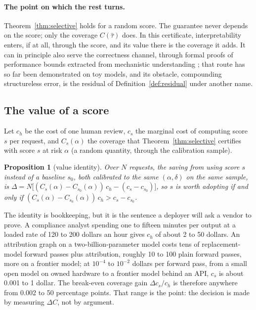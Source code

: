 \documentclass[11pt,letterpaper]{article}
\newcommand{\tauhat}{\hat{\tau}}
\theoremstyle{plain}
\newtheorem{proposition}{Proposition}
\theoremstyle{definition}
\theoremstyle{remark}
\begin{document}
\paragraph{The point on which the rest turns.} Theorem~\ref{thm:selective} holds for a random score. The guarantee never depends on the score; only the coverage $C(\tauhat)$ does. In this certificate, interpretability enters, if at all, through the score, and its value there is the coverage it adds. It can in principle also serve the correctness channel, through formal proofs of performance bounds extracted from mechanistic understanding \citep{gross2024}; that route has so far been demonstrated on toy models, and its obstacle, compounding structureless error, is the residual of Definition~\ref{def:residual} under another name.

\subsection{The value of a score}

Let $c_h$ be the cost of one human review, $c_s$ the marginal cost of computing score $s$ per request, and $C_s(\alpha)$ the coverage that Theorem~\ref{thm:selective} certifies with score $s$ at risk $\alpha$ (a random quantity, through the calibration sample).

\begin{proposition}[value identity]
\label{prop:value}
Over $N$ requests, the saving from using score $s$ instead of a baseline $s_0$, both calibrated to the same $(\alpha,\delta)$ on the same sample, is
$\Delta=N\big[(C_s(\alpha)-C_{s_0}(\alpha))\,c_h-(c_s-c_{s_0})\big]$,
so $s$ is worth adopting if and only if $(C_s(\alpha)-C_{s_0}(\alpha))\,c_h>c_s-c_{s_0}$.
\end{proposition}

The identity is bookkeeping, but it is the sentence a deployer will ask a vendor to prove. A compliance analyst spending one to fifteen minutes per output at a loaded rate of 120 to 200 dollars an hour gives $c_h$ of about 2 to 50 dollars. An attribution graph on a two-billion-parameter model costs tens of replacement-model forward passes plus attribution, roughly 10 to 100 plain forward passes, more on a frontier model; at $10^{-4}$ to $10^{-2}$ dollars per forward pass, from a small open model on owned hardware to a frontier model behind an API, $c_s$ is about 0.001 to 1 dollar. The break-even coverage gain $\Delta c_s/c_h$ is therefore anywhere from 0.002 to 50 percentage points. That range is the point: the decision is made by measuring $\Delta C$, not by argument.
\end{document}
